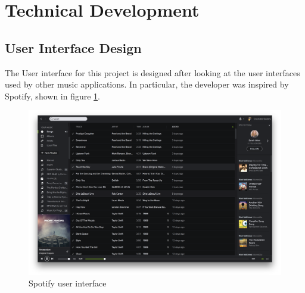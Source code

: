 \section{Technical Development}
\subsection{User Interface Design}
The User interface for this project is designed after looking at the user interfaces used by other music applications. In particular, the developer was inspired by Spotify, shown in figure \ref{fig:spotify}.

\begin{figure}[h]
    \centering
    \includegraphics[width=\textwidth]{screen.png}
    \caption{Spotify user interface}
    \label{fig:spotify}
\end{figure}

